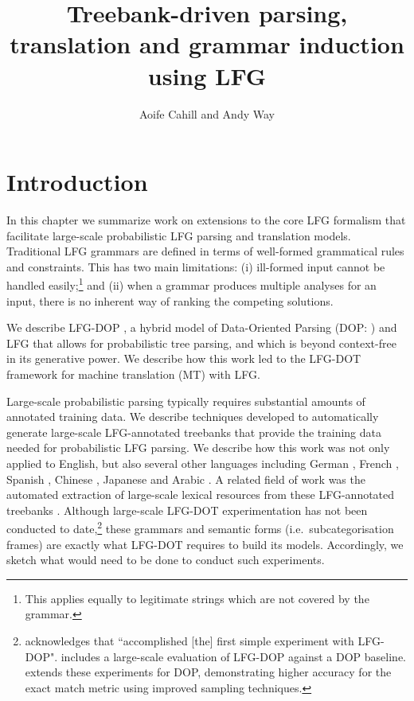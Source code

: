 \documentclass[output=paper,hidelinks]{langscibook}
\title{Treebank-driven parsing, translation and grammar induction using LFG}
\author{Aoife Cahill\affiliation{Educational Testing Service} and Andy Way\affiliation{ADAPT Centre, School of Computing, Dublin City University}}
\begin{document}
\maketitle
\label{chap:GrammarInduction}

\section{Introduction}
\largerpage
In this chapter we summarize work on extensions to the core LFG formalism that facilitate large-scale probabilistic LFG parsing and translation models. Traditional LFG grammars \citep{kaplanbresnan82} are defined in terms of well-formed grammatical rules and constraints. This has two main limitations: (i) ill-formed input cannot be handled easily;\footnote{This applies equally to legitimate strings which are not covered by the grammar.} and (ii) when a grammar produces multiple analyses for an input, there is no inherent way of ranking the competing solutions. 

We describe LFG-DOP \citep{bod-kaplan-1998-probabilistic-corpus}, a hybrid model of Data-Oriented Parsing (DOP: \citealt{Bod92,Simaan95,Bod98}) and LFG that allows for probabilistic tree parsing, and which is beyond context-free in its generative power. We describe how this work led to the LFG-DOT framework \citep{Way99,Way01} for machine translation (MT) with LFG.

Large-scale probabilistic parsing typically requires substantial amounts of annotated training data. We describe techniques developed to automatically generate large-scale LFG-annotated treebanks that provide the training data needed for probabilistic LFG parsing. We describe how this work was not only applied to English, but also several other languages including German \citep{cahill2005multilingual,RehbeinAutomatic:lfg09}, French \citep{Schluter:2011}, Spanish \citep{odonovan-EtAl:2005:LFG,ChrupalaImproving:lfg06}, Chinese \citep{burke2004evaluating,Guo:09}, Japanese \citep{oya-genabith-2007-automatic} and Arabic \citep{tounsi-etal-2009-automatic}. A related field of work was the automated extraction of large-scale lexical resources from these LFG-annotated treebanks \citep{odonovan:2006}. Although large-scale LFG-DOT experimentation has not been conducted to date,\footnote{\citet{Bod2000} acknowledges that \citet{Cormons} ``accomplished [the] first simple experiment with LFG-DOP". \citet{BK2003} includes a large-scale evaluation of LFG-DOP against a DOP baseline. \citet{Hearne} extends these experiments for DOP, demonstrating higher accuracy for the exact match metric using improved sampling techniques.} these grammars and semantic forms (i.e.\ subcategorisation frames) are exactly what LFG-DOT requires to build its models. Accordingly, we sketch what would need to be done to conduct such experiments.
\end{document}
